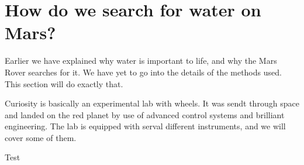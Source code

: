 \section*{How do we search for water on Mars?}
Earlier we have explained why water is important to life, and why the Mars Rover searches for it.
We have yet to go into the details of the methods used.
This section will do exactly that.


Curiosity is basically an experimental lab with wheels.
It was sendt through space and landed on the red planet by use of advanced control systems and brilliant engineering.
The lab is equipped with serval different instruments, and we will cover some of them.

Test
